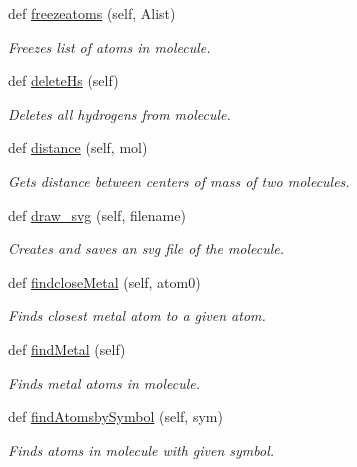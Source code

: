 \begin{DoxyCompactItemize}
def \hyperlink{classmolSimplify_1_1Classes_1_1mol3D_1_1mol3D_a629f2ff84af7df7a809fe5e8f879f6a3}{freezeatoms} (self, Alist)
\begin{DoxyCompactList}\small\item\em Freezes list of atoms in molecule. \end{DoxyCompactList}\item 
def \hyperlink{classmolSimplify_1_1Classes_1_1mol3D_1_1mol3D_a91e56cc05405772f174a4eda98d86f41}{delete\+Hs} (self)
\begin{DoxyCompactList}\small\item\em Deletes all hydrogens from molecule. \end{DoxyCompactList}\item 
def \hyperlink{classmolSimplify_1_1Classes_1_1mol3D_1_1mol3D_a7f5c446c9d071037c5500408ab57a8f6}{distance} (self, mol)
\begin{DoxyCompactList}\small\item\em Gets distance between centers of mass of two molecules. \end{DoxyCompactList}\item 
def \hyperlink{classmolSimplify_1_1Classes_1_1mol3D_1_1mol3D_afc2743674602def7c8d9457cb40a2899}{draw\+\_\+svg} (self, filename)
\begin{DoxyCompactList}\small\item\em Creates and saves an svg file of the molecule. \end{DoxyCompactList}\item 
def \hyperlink{classmolSimplify_1_1Classes_1_1mol3D_1_1mol3D_a3a4f5d88b74124789e380f28d1038fad}{findclose\+Metal} (self, atom0)
\begin{DoxyCompactList}\small\item\em Finds closest metal atom to a given atom. \end{DoxyCompactList}\item 
def \hyperlink{classmolSimplify_1_1Classes_1_1mol3D_1_1mol3D_aff49b31bdc2ef9d33a3b67642b6f70d2}{find\+Metal} (self)
\begin{DoxyCompactList}\small\item\em Finds metal atoms in molecule. \end{DoxyCompactList}\item 
def \hyperlink{classmolSimplify_1_1Classes_1_1mol3D_1_1mol3D_adb95387b07a9714c03db4975a192e08c}{find\+Atomsby\+Symbol} (self, sym)
\begin{DoxyCompactList}\small\item\em Finds atoms in molecule with given symbol. \end{DoxyCompactList}\item 

\end{DoxyCompactItemize}
